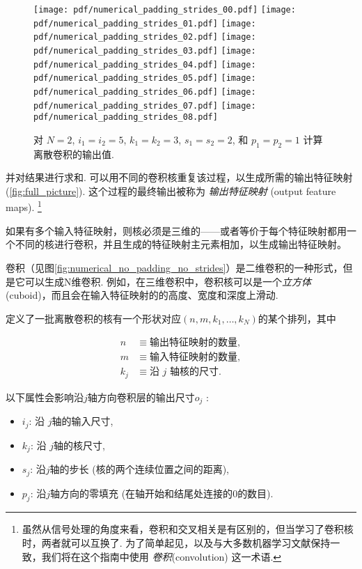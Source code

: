 \documentclass[notitlepage]{ctexrep}
\begin{document}
\begin{figure}[p]
    \centering
    \texttt{[image: pdf/numerical\_padding\_strides\_00.pdf]}
    \texttt{[image: pdf/numerical\_padding\_strides\_01.pdf]}
    \texttt{[image: pdf/numerical\_padding\_strides\_02.pdf]}
    \texttt{[image: pdf/numerical\_padding\_strides\_03.pdf]}
    \texttt{[image: pdf/numerical\_padding\_strides\_04.pdf]}
    \texttt{[image: pdf/numerical\_padding\_strides\_05.pdf]}
    \texttt{[image: pdf/numerical\_padding\_strides\_06.pdf]}
    \texttt{[image: pdf/numerical\_padding\_strides\_07.pdf]}
    \texttt{[image: pdf/numerical\_padding\_strides\_08.pdf]}
    \caption{\label{fig:numerical_padding_strides} 对 $N = 2$, $i_1 = i_2 = 5$, $k_1 = k_2 = 3$, $s_1 = s_2 = 2$, 和 $p_1 = p_2 = 1$ 计算离散卷积的输出值.}
\end{figure}


\noindent 并对结果进行求和. 可以用不同的卷积核重复该过程，以生成所需的输出特征映射  (\autoref{fig:full_picture}). 这个过程的最终输出被称为 {\em 输出特征映射} (output feature maps). \footnote{%
    虽然从信号处理的角度来看，卷积和交叉相关是有区别的，但当学习了卷积核时，两者就可以互换了. 为了简单起见，以及与大多数机器学习文献保持一致，我们将在这个指南中使用 {\em 卷积\/}(convolution) 这一术语.}

如果有多个输入特征映射，则核必须是三维的——或者等价于每个特征映射都用一个不同的核进行卷积，并且生成的特征映射主元素相加，以生成输出特征映射。

卷积（见图\autoref{fig:numerical_no_padding_no_strides}）是二维卷积的一种形式，但是它可以生成N维卷积. 例如，在三维卷积中，卷积核可以是一个{\em 立方体\/} (cuboid)，而且会在输入特征映射的的高度、宽度和深度上滑动. 

定义了一批离散卷积的核有一个形状对应$(n, m, k_1, \ldots, k_N)$的某个排列，其中

\begin{equation*}
\begin{split}
    n &\equiv \text{输出特征映射的数量},\\
    m &\equiv \text{输入特征映射的数量},\\
    k_j &\equiv \text{沿 $j$ 轴核的尺寸}.
\end{split}
\end{equation*}

以下属性会影响沿$j$轴方向卷积层的输出尺寸$o_j$ : 
\begin{itemize}
    \item $i_j$: 沿 $j$轴的输入尺寸,
    \item $k_j$: 沿 $j$轴的核尺寸,
    \item $s_j$: 沿$j$轴的步长 (核的两个连续位置之间的距离),
    \item $p_j$: 沿$j$轴方向的零填充 (在轴开始和结尾处连接的$0$的数目).
\end{itemize}
\end{document}
